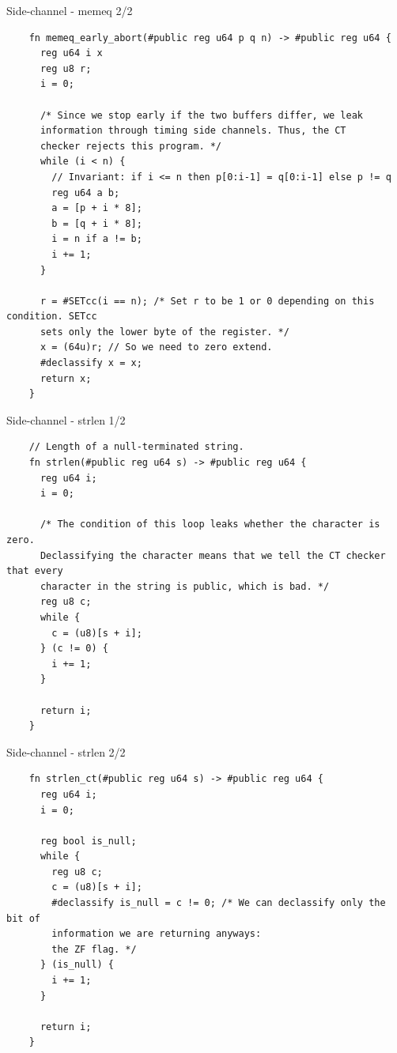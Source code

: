 \begin{frame}[fragile]{Side-channel - memeq 2/2}
  \lstset{
    language=Jasmin,
    basicstyle=\scriptsize\ttfamily,
    escapechar=~~,
  }
  \begin{lstlisting}
    fn memeq_early_abort(#public reg u64 p q n) -> #public reg u64 {
      reg u64 i x
      reg u8 r;
      i = 0;

      /* Since we stop early if the two buffers differ, we leak
      information through timing side channels. Thus, the CT
      checker rejects this program. */
      while (i < n) {
        // Invariant: if i <= n then p[0:i-1] = q[0:i-1] else p != q
        reg u64 a b;
        a = [p + i * 8];
        b = [q + i * 8];
        i = n if a != b;
        i += 1;
      }

      r = #SETcc(i == n); /* Set r to be 1 or 0 depending on this condition. SETcc
      sets only the lower byte of the register. */
      x = (64u)r; // So we need to zero extend.
      #declassify x = x;
      return x;
    }
  \end{lstlisting}
\end{frame}


\begin{frame}[fragile]{Side-channel - strlen 1/2}
  \lstset{
    language=Jasmin,
    basicstyle=\footnotesize\ttfamily,
    escapechar=~~,
  }
  \begin{lstlisting}
    // Length of a null-terminated string.
    fn strlen(#public reg u64 s) -> #public reg u64 {
      reg u64 i;
      i = 0;

      /* The condition of this loop leaks whether the character is zero.
      Declassifying the character means that we tell the CT checker that every
      character in the string is public, which is bad. */
      reg u8 c;
      while {
        c = (u8)[s + i];
      } (c != 0) {
        i += 1;
      }

      return i;
    }
  \end{lstlisting}
\end{frame}

\begin{frame}[fragile]{Side-channel - strlen 2/2}
  \lstset{
    language=Jasmin,
    basicstyle=\footnotesize\ttfamily,
    escapechar=~~,
  }
  \begin{lstlisting}
    fn strlen_ct(#public reg u64 s) -> #public reg u64 {
      reg u64 i;
      i = 0;

      reg bool is_null;
      while {
        reg u8 c;
        c = (u8)[s + i];
        #declassify is_null = c != 0; /* We can declassify only the bit of
        information we are returning anyways:
        the ZF flag. */
      } (is_null) {
        i += 1;
      }

      return i;
    }
  \end{lstlisting}
\end{frame}


